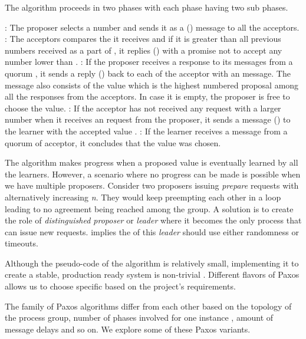 The algorithm proceeds in two phases with each phase having two sub phases.

\begin{itemize}
  : The proposer selects a number  and sends it as a
   () message to all the acceptors.
  : The acceptors compares the  it
  receives and if it is greater than all previous numbers received as a part of
  , it replies () with a promise not to accept any
  number lower than .
  : If the proposer receives a response to its 
  messages from a quorum%
  , it sends a reply () back to each of the acceptor with an
   message. The message also consists of the value 
  which is the highest numbered proposal among all the responses from the
  acceptors. In case it is empty, the proposer is free to choose the value.
  : If the acceptor has not received any  request
  with a larger number when it receives an  request from the
  proposer, it sends a message () to the learner with the accepted
  value .
  : If the learner receives a message from a quorum of acceptor,
  it concludes that the value  was chosen.
\end{itemize}

The algorithm makes progress when a proposed value is eventually learned by all
the learners. However, a scenario where no progress can be made is possible
when we have multiple proposers. Consider two proposers issuing \emph{prepare}
requests with alternatively increasing \emph{n}. They would keep
preempting each other in a loop leading to no agreement being reached among the
group. A solution is to create the role of \emph{distinguished proposer} or
\emph{leader} where it becomes the only process that can issue new requests.
\citet{FisLynPat85} implies the  of this \emph{leader}
should use either randomness or timeouts.

Although the pseudo-code of the algorithm is relatively small, implementing it
to create a stable, production ready system is non-trivial \citep{ChandraGR07}.
Different flavors of Paxos allows us to choose specific based on the project's
requirements.

The family of Paxos algorithms differ from each other based on the topology
of the process group, number of phases involved for one instance%
, amount of message delays and so on. We explore some of these Paxos variants.

